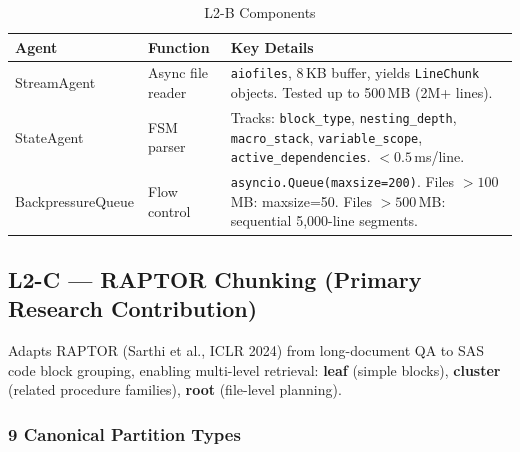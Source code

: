 \documentclass[11pt,a4paper]{article}
\begin{document}
\begin{table}[H]
\centering
\caption{L2-B Components}
\renewcommand{\arraystretch}{1.3}
\small
\begin{tabularx}{\textwidth}{@{} l L{3cm} X @{}}
\toprule
\textbf{Agent} & \textbf{Function} & \textbf{Key Details} \\
\midrule
StreamAgent & Async file reader & \texttt{aiofiles}, 8\,KB buffer, yields \texttt{LineChunk} objects. Tested up to 500\,MB (2M+ lines). \\
\addlinespace
StateAgent & FSM parser & Tracks: \texttt{block\_type}, \texttt{nesting\_depth}, \texttt{macro\_stack}, \texttt{variable\_scope}, \texttt{active\_dependencies}. $<0.5$\,ms/line. \\
\addlinespace
BackpressureQueue & Flow control & \texttt{asyncio.Queue(maxsize=200)}. Files $>100$\,MB: maxsize=50. Files $>500$\,MB: sequential 5,000-line segments. \\
\bottomrule
\end{tabularx}
\end{table}

\subsection{L2-C — RAPTOR Chunking (Primary Research Contribution)}

\begin{warnbox}
Adapts RAPTOR (Sarthi et al., ICLR 2024) from long-document QA to SAS code block grouping, enabling multi-level retrieval: \textbf{leaf} (simple blocks), \textbf{cluster} (related procedure families), \textbf{root} (file-level planning).
\end{warnbox}

\subsubsection{9 Canonical Partition Types}
\end{document}
